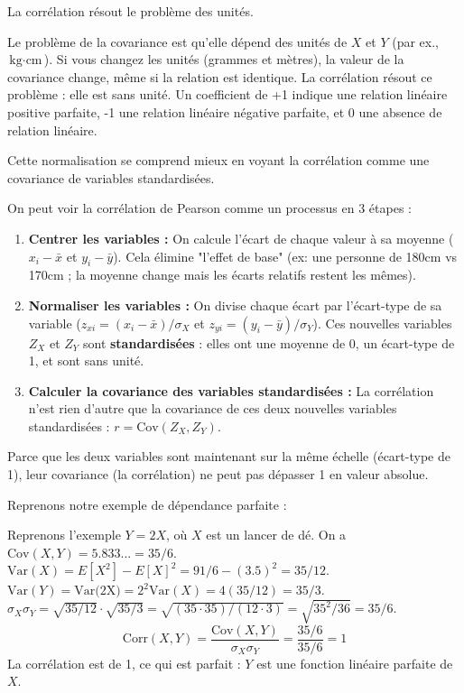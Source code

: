 La corrélation résout le problème des unités.

\begin{intuitionbox}
Le problème de la covariance est qu'elle dépend des unités de $X$ et $Y$ (par ex., $\text{kg} \cdot \text{cm}$). Si vous changez les unités (grammes et mètres), la valeur de la covariance change, même si la relation est identique. La corrélation résout ce problème : elle est sans unité. Un coefficient de +1 indique une relation linéaire positive parfaite, -1 une relation linéaire négative parfaite, et 0 une absence de relation linéaire.
\end{intuitionbox}

Cette normalisation se comprend mieux en voyant la corrélation comme une covariance de variables standardisées.

\begin{intuitionbox}
On peut voir la corrélation de Pearson comme un processus en 3 étapes :
\begin{enumerate}
    \item \textbf{Centrer les variables :} On calcule l'écart de chaque valeur à sa moyenne ($x_i - \bar{x}$ et $y_i - \bar{y}$). Cela élimine "l'effet de base" (ex: une personne de 180cm vs 170cm ; la moyenne change mais les écarts relatifs restent les mêmes).
    \item \textbf{Normaliser les variables :} On divise chaque écart par l'écart-type de sa variable ($z_{xi} = (x_i - \bar{x})/\sigma_X$ et $z_{yi} = (y_i - \bar{y})/\sigma_Y$). Ces nouvelles variables $Z_X$ et $Z_Y$ sont \textbf{standardisées} : elles ont une moyenne de 0, un écart-type de 1, et sont sans unité.
    \item \textbf{Calculer la covariance des variables standardisées :} La corrélation n'est rien d'autre que la covariance de ces deux nouvelles variables standardisées : $r = \text{Cov}(Z_X, Z_Y)$.
\end{enumerate}
Parce que les deux variables sont maintenant sur la même échelle (écart-type de 1), leur covariance (la corrélation) ne peut pas dépasser 1 en valeur absolue.
\end{intuitionbox}

Reprenons notre exemple de dépendance parfaite :

\begin{examplebox}
Reprenons l'exemple $Y=2X$, où $X$ est un lancer de dé.
On a $\text{Cov}(X,Y) = 5.833... = 35/6$.
$\text{Var}(X) = E[X^2] - E[X]^2 = 91/6 - (3.5)^2 = 35/12$.
$\text{Var}(Y) = \text{Var(2X)} = 2^2 \text{Var}(X) = 4(35/12) = 35/3$.
$\sigma_X \sigma_Y = \sqrt{35/12} \cdot \sqrt{35/3} = \sqrt{(35 \cdot 35) / (12 \cdot 3)} = \sqrt{35^2 / 36} = 35/6$.
$$\text{Corr}(X,Y) = \frac{\text{Cov}(X,Y)}{\sigma_X \sigma_Y} = \frac{35/6}{35/6} = 1$$
La corrélation est de 1, ce qui est parfait : $Y$ est une fonction linéaire parfaite de $X$.
\end{examplebox}

